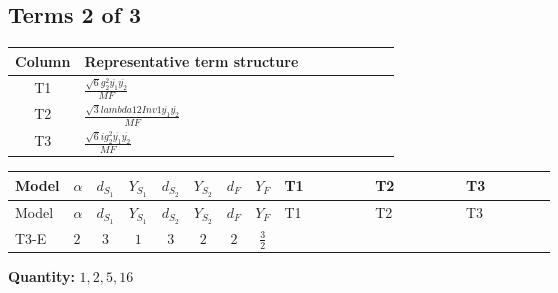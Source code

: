 \documentclass[8pt]{article}
\begin{document}
\begin{landscape}
\subsection*{Terms 2 of 3}
\begin{center}
\begin{tabular}{@{}c >{\raggedright\arraybackslash}p{0.82\linewidth}@{}}
\toprule
Column & Representative term structure \\
\midrule
T1 & \(\displaystyle \frac{\sqrt{6} g_{2}^{2} \overline{y_{1}} \overline{y_{2}}}{MF}\) \\
\midrule
T2 & \(\displaystyle \frac{\sqrt{3} lambda12Inv1 \overline{y_{1}} \overline{y_{2}}}{MF}\) \\
\midrule
T3 & \(\displaystyle \frac{\sqrt{6} i g_{2}^{2} \overline{y_{1}} \overline{y_{2}}}{MF}\) \\
\midrule
\bottomrule
\end{tabular}
\end{center}
\smallskip
\tiny
\begin{longtable}{@{}llcccccc >{\raggedright\arraybackslash}p{0.21\linewidth} >{\raggedright\arraybackslash}p{0.21\linewidth} >{\raggedright\arraybackslash}p{0.21\linewidth}@{}}
\toprule
Model & $\alpha$ & $d_{S_1}$ & $Y_{S_1}$ & $d_{S_2}$ & $Y_{S_2}$ & $d_F$ & $Y_F$ & T1 & T2 & T3 \\
\midrule
\endfirsthead
\toprule
Model & $\alpha$ & $d_{S_1}$ & $Y_{S_1}$ & $d_{S_2}$ & $Y_{S_2}$ & $d_F$ & $Y_F$ & T1 & T2 & T3 \\
\midrule
\endhead
T3-E & $2$ & $3$ & $1$ & $3$ & $2$ & $2$ & $\frac{3}{2}$ & \scriptsize\adjustbox{max width=\linewidth}{$\begin{gathered} - \frac{\sqrt{6} g_{2}^{2} \overline{y_{1}} \overline{y_{2}}}{6 MF}\end{gathered}$} & \scriptsize\adjustbox{max width=\linewidth}{$\begin{gathered} \frac{\sqrt{3} lambda12Inv1 \overline{y_{1}} \overline{y_{2}}}{6 MF}\end{gathered}$} & \scriptsize\adjustbox{max width=\linewidth}{$\begin{gathered} - \frac{\sqrt{6} i g_{2}^{2} \overline{y_{1}} \overline{y_{2}}}{6 MF}\end{gathered}$} \\
\midrule
\bottomrule
\end{longtable}
\clearpage
\noindent\textbf{Quantity: }$\mathrm{1,2,5,16}$\par\smallskip

\end{landscape}
\end{document}
